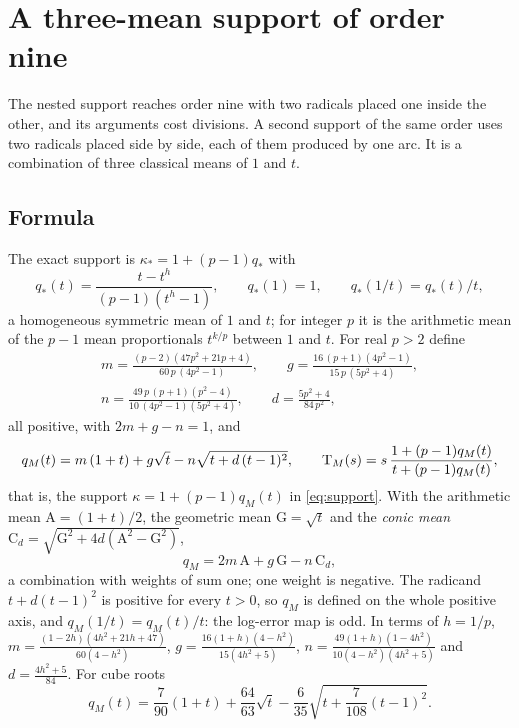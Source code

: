 \section{A three-mean support of order nine}\label{sec:mean}

The nested support reaches order nine with two radicals placed one inside the other, and its arguments
cost divisions. A second support of the same order uses two radicals placed side by side, each of them
produced by one arc. It is a combination of three classical means of $1$ and $t$.

\subsection{Formula}

The exact support is $\kappa_*=1+(p-1)q_*$ with
\[ q_*(t)=\frac{t-t^{h}}{(p-1)(t^{h}-1)},\qquad q_*(1)=1,\qquad q_*(1/t)=q_*(t)/t , \]
a homogeneous symmetric mean of $1$ and $t$; for integer $p$ it is the arithmetic mean of the $p-1$
mean proportionals $t^{k/p}$ between $1$ and $t$. For real $p>2$ define
\begin{equation}\label{eq:mcoeff}
\begin{gathered}
m=\frac{(p-2)(47p^{2}+21p+4)}{60\,p\,(4p^{2}-1)},\qquad
g=\frac{16\,(p+1)(4p^{2}-1)}{15\,p\,(5p^{2}+4)},\\[2pt]
n=\frac{49\,p\,(p+1)(p^{2}-4)}{10\,(4p^{2}-1)(5p^{2}+4)},\qquad
d=\frac{5p^{2}+4}{84\,p^{2}} ,
\end{gathered}
\end{equation}
all positive, with $2m+g-n=1$, and
\begin{equation}\label{eq:qM}
q_M(t)=m\,(1+t)+g\sqrt t-n\sqrt{t+d\,(t-1)^{2}},\qquad
\mathrm{T}_{M}(s)=s\,\frac{1+(p-1)q_M(t)}{t+(p-1)q_M(t)},
\end{equation}
that is, the support $\kappa=1+(p-1)q_M(t)$ in \eqref{eq:support}. With the arithmetic mean
$\mathrm A=(1+t)/2$, the geometric mean $\mathrm G=\sqrt t$ and the \emph{conic mean}
$\mathrm C_d=\sqrt{\mathrm G^{2}+4d(\mathrm A^{2}-\mathrm G^{2})}$,
\[ q_M=2m\,\mathrm A+g\,\mathrm G-n\,\mathrm C_d , \]
a combination with weights of sum one; one weight is negative. The radicand $t+d(t-1)^{2}$ is positive
for every $t>0$, so $q_M$ is defined on the whole positive axis, and $q_M(1/t)=q_M(t)/t$: the log-error
map is odd. In terms of $h=1/p$,
$m=\frac{(1-2h)(4h^{2}+21h+47)}{60(4-h^{2})}$, $g=\frac{16(1+h)(4-h^{2})}{15(4h^{2}+5)}$,
$n=\frac{49(1+h)(1-4h^{2})}{10(4-h^{2})(4h^{2}+5)}$ and $d=\frac{4h^{2}+5}{84}$. For cube roots
\begin{equation}\label{eq:qMcubic}
q_M(t)=\frac{7}{90}(1+t)+\frac{64}{63}\sqrt t-\frac{6}{35}\sqrt{t+\frac{7}{108}(t-1)^{2}} .
\end{equation}

